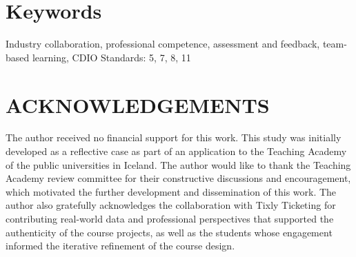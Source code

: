 \documentclass[11pt]{cdio}
\begin{document}
\section{Keywords}
Industry collaboration, professional competence,
assessment and feedback, team-based learning, CDIO Standards: 5, 7, 8, 11




\newpage{}%



\section{ACKNOWLEDGEMENTS}
The author received no financial support for this work. This study was initially developed as a reflective case as part of an application to the Teaching Academy of the public universities in Iceland. The author would like to thank the Teaching Academy review committee for their constructive discussions and encouragement, which motivated the further development and dissemination of this work. The author also gratefully acknowledges the collaboration with Tixly Ticketing for contributing real-world data and professional perspectives that supported the authenticity of the course projects, as well as the students whose engagement informed the iterative refinement of the course design.

\setlength\bibitemsep{2pt}%

\printbibliography{}
\end{document}
